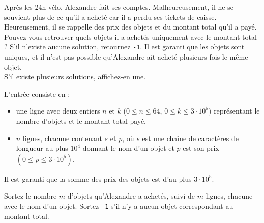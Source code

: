 \problemname{\problemyamlname}

\newcommand{\maxk}{3 \cdot 10^5}
\newcommand{\maxn}{64}

Après les 24h vélo, Alexandre fait ses comptes. Malheureusement, il ne se souvient plus de ce qu'il a acheté car il a perdu ses tickets de caisse. Heureusement, il se rappelle des prix des objets et du montant total qu'il a payé. Pouvez-vous retrouver quels objets il a achetés uniquement avec le montant total ? S'il n'existe aucune solution, retournez \texttt{-1}. Il est garanti que les objets sont uniques, et il n'est pas possible qu'Alexandre ait acheté plusieurs fois le même objet. \\
S'il existe plusieurs solutions, affichez-en une.

\begin{Input}
    L'entrée consiste en :
    \begin{itemize}
        \item une ligne avec deux entiers $n$ et $k$ ($0 \leq n \leq \maxn$, $0 \leq k \leq \maxk)$ représentant le nombre d'objets et le montant total payé,
        \item $n$ lignes, chacune contenant $s$ et $p$, où $s$ est une chaîne de caractères de longueur au plus $10^4$ donnant le nom d'un objet et $p$ est son prix $(0 \leq p \leq \maxk)$.
    \end{itemize}
    Il est garanti que la somme des prix des objets est d'au plus $\maxk$.
\end{Input}

\begin{Output}
    Sortez le nombre $m$ d'objets qu'Alexandre a achetés, suivi de $m$ lignes, chacune avec le nom d'un objet. Sortez \texttt{-1} s'il n'y a aucun objet correspondant au montant total.
\end{Output}
